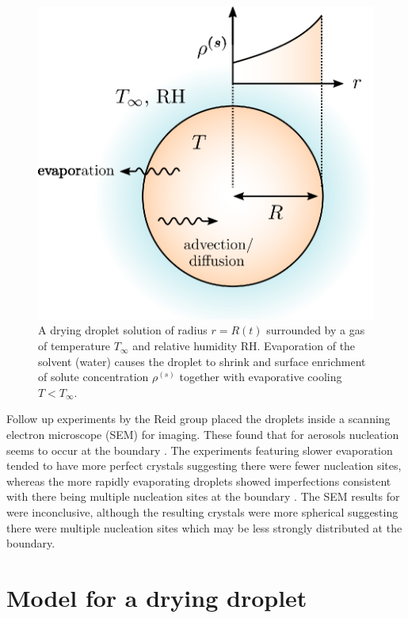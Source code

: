 \documentclass[11pt,twoside]{report}
\begin{document}
\begin{figure}
  \includegraphics[width=0.75\linewidth,outer]{aerosol-droplet}
  \caption[Model drying aerosol droplet]{
    A drying droplet solution of radius $r=R(t)$ surrounded by a gas of temperature $T_\infty$ and relative humidity RH.
    Evaporation of the solvent (water) causes the droplet to shrink and surface enrichment of solute concentration $\rho^{(s)}$ together with evaporative cooling $T < T_\infty$.}
  \label{fig:aerosol-droplet}
\end{figure}

Follow up experiments by the Reid group placed the droplets inside a scanning electron microscope (SEM) for imaging.
These found that for  aerosols nucleation seems to occur at the boundary%
.
The experiments featuring slower evaporation tended to have more perfect crystals suggesting there were fewer nucleation sites, whereas the more rapidly evaporating droplets showed imperfections consistent with there being multiple nucleation sites at the boundary \cite{GregsonTBD2019}.
The SEM results for  were inconclusive, although the resulting crystals were more spherical suggesting there were multiple nucleation sites which may be less strongly distributed at the boundary.

\section{Model for a drying droplet}
\label{sec:evolution}
\end{document}
